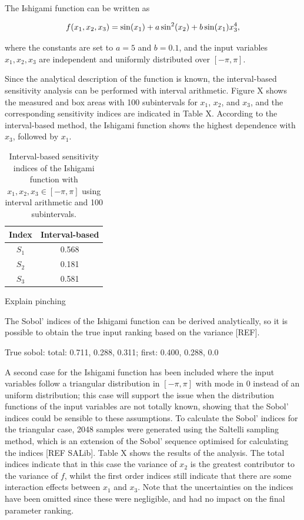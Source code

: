 \documentclass[twocolumn]{rps-esrel2022}
\begin{document}
The Ishigami function can be written as

\begin{equation}
	\centering
	f(x_1,x_2,x_3) = \sin(x_1) + a\sin^2(x_2) + b\sin(x_1)x_3^4{,}
\end{equation}

where the constants are set to $a=5$ and $b=0.1$, and the input variables $x_1,x_2,x_3$ are independent and uniformly distributed
over $[-\pi,\pi]$.

Since the analytical description of the function is known, the interval-based sensitivity analysis can be performed with interval
arithmetic.
Figure X shows the measured and box areas with 100 subintervals for $x_1$, $x_2$, and $x_3$, and the corresponding sensitivity
indices are indicated in Table X.
According to the interval-based method, the Ishigami function shows the highest dependence with $x_3$, followed by $x_1$.

\begin{table}[!h]
	\centering
	\caption{Interval-based sensitivity indices of the Ishigami function with $x_1,x_2,x_3 \in [-\pi,\pi]$ using interval arithmetic
	and 100 subintervals.}
	\begin{tabular}{cc}
	\hline
	Index & Interval-based \\ \hline
	$S_1$ & 0.568 \\
	$S_2$ & 0.181 \\
	$S_3$ & 0.581 \\ \hline
	\end{tabular}%
\end{table}


Explain pinching


The Sobol' indices of the Ishigami function can be derived analytically, so it is possible to obtain the true input ranking based on the
variance [REF].


True sobol: total: 0.711, 0.288, 0.311; first: 0.400, 0.288, 0.0

A second case for the Ishigami function has been included where the input variables follow a triangular distribution in $[-\pi,\pi]$ with mode in $0$
instead of an uniform distribution; this case will support the issue when the distribution functions of the input variables are not totally known, showing
that the Sobol' indices could be sensible to these assumptions.
To calculate the Sobol' indices for the triangular case, 2048 samples were generated using the Saltelli sampling method, which is an extension of the Sobol'
sequence optimised for calculating the indices [REF SALib].
Table X shows the results of the analysis.
The total indices indicate that in this case the variance of $x_2$ is the greatest contributor to the variance of $f$, whilst the first order indices still indicate
that there are some interaction effects between $x_1$ and $x_3$.
Note that the uncertainties on the indices have been omitted since these were negligible, and had no impact on the final parameter ranking.
\end{document}
